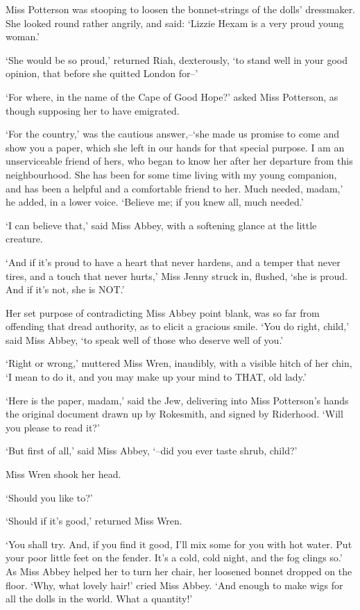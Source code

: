 Miss Potterson was stooping to loosen the bonnet-strings of the dolls’
dressmaker. She looked round rather angrily, and said: ‘Lizzie Hexam is
a very proud young woman.’

‘She would be so proud,’ returned Riah, dexterously, ‘to stand well in
your good opinion, that before she quitted London for--’

‘For where, in the name of the Cape of Good Hope?’ asked Miss Potterson,
as though supposing her to have emigrated.

‘For the country,’ was the cautious answer,--‘she made us promise to
come and show you a paper, which she left in our hands for that special
purpose. I am an unserviceable friend of hers, who began to know her
after her departure from this neighbourhood. She has been for some time
living with my young companion, and has been a helpful and a comfortable
friend to her. Much needed, madam,’ he added, in a lower voice. ‘Believe
me; if you knew all, much needed.’

‘I can believe that,’ said Miss Abbey, with a softening glance at the
little creature.

‘And if it’s proud to have a heart that never hardens, and a temper
that never tires, and a touch that never hurts,’ Miss Jenny struck in,
flushed, ‘she is proud. And if it’s not, she is NOT.’

Her set purpose of contradicting Miss Abbey point blank, was so far from
offending that dread authority, as to elicit a gracious smile. ‘You do
right, child,’ said Miss Abbey, ‘to speak well of those who deserve well
of you.’

‘Right or wrong,’ muttered Miss Wren, inaudibly, with a visible hitch of
her chin, ‘I mean to do it, and you may make up your mind to THAT, old
lady.’

‘Here is the paper, madam,’ said the Jew, delivering into Miss
Potterson’s hands the original document drawn up by Rokesmith, and
signed by Riderhood. ‘Will you please to read it?’

‘But first of all,’ said Miss Abbey, ‘--did you ever taste shrub,
child?’

Miss Wren shook her head.

‘Should you like to?’

‘Should if it’s good,’ returned Miss Wren.

‘You shall try. And, if you find it good, I’ll mix some for you with hot
water. Put your poor little feet on the fender. It’s a cold, cold night,
and the fog clings so.’ As Miss Abbey helped her to turn her chair, her
loosened bonnet dropped on the floor. ‘Why, what lovely hair!’ cried
Miss Abbey. ‘And enough to make wigs for all the dolls in the world.
What a quantity!’

